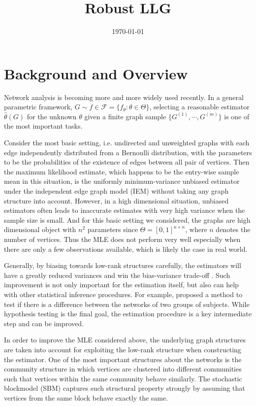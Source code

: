 \documentclass[a4paper]{article}
\title{Robust LLG}
\date{\today}
\renewcommand{\hat}{\widehat}
\begin{document}
\maketitle

\section{Background and Overview}

Network analysis is becoming more and more widely used recently. In a general parametric framework, $G \sim f \in \mathcal{F} = \{f_{\theta} : \theta \in \Theta \}$, selecting a reasonable estimator $\hat{\theta}(G)$ for the unknown $\theta$ given a finite graph sample $\{G^{(1)}, \cdots, G^{(m)}\}$ is one of the most important tasks.

Consider the most basic setting, i.e. undirected and unweighted graphs with each edge independently distributed from a Bernoulli distribution, with the parameters to be the probabilities of the existence of edges between all pair of vertices.
Then the maximum likelihood estimate, which happens to be the entry-wise sample mean in this situation, is the uniformly minimum-variance unbiased estimator under the independent edge graph model (IEM) \citep{bollobas2007phase} without taking any graph structure into account. 
However, in a high dimensional situation, unbiased estimators often leads to inaccurate estimates with very high variance when the sample size is small. And for this basic setting we considered, the graphs are high dimensional object with $n^2$ parameters since $\Theta = [0, 1]^{n\times n}$, where $n$ denotes the number of vertices. Thus the MLE does not perform very well especially when there are only a few observations available, which is likely the case in real world.

Generally, by biasing towards low-rank structures carefully, the estimators will have a greatly reduced variances and win the bias-variance trade-off \citep{trunk1979problem}. Such improvement is not only important for the estimation itself, but also can help with other statistical inference procedures. For example, \citet{ginestet2014hypothesis} proposed a method to test if there is a difference between the networks of two groups of subjects. While hypothesis testing is the final goal, the estimation procedure is a key intermediate step and can be improved.

In order to improve the MLE considered above, the underlying graph structures are taken into account for exploiting the low-rank structure when constructing the estimator. One of the most important structures about the networks is the community structure in which vertices are clustered into different communities such that vertices within the same community behave similarly. The stochastic blockmodel (SBM) \citep{holland1983stochastic} captures such structural property strongly by assuming that vertices from the same block behave exactly the same.
\end{document}
